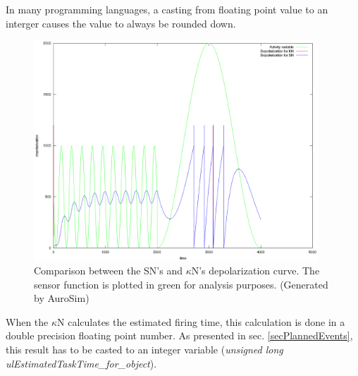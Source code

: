 In many programming languages, a casting from floating point value to an interger causes the value to always be rounded down.


\begin{figure}[hb!tp]
	\centering
		\includegraphics[width=0.95\textwidth]{eps_Comparison_between_the_two_sensors__depol_FIKSA.eps}
	\caption{Comparison between the SN's and $\kappa$N's depolarization curve. The sensor function is plotted in green for analysis purposes. 
			(Generated by AuroSim)}
	\label{figComparisonBetweenSsensorAndKsensorDepolCurveFIXEdError}
\end{figure}

When the $\kappa$N calculates the estimated firing time, this calculation is done in a double precision floating point number. 
As presented in sec. \ref{secPlannedEvents}, this result has to be casted to an integer variable (\emph{unsigned long ulEstimatedTaskTime\_for\_object}).

